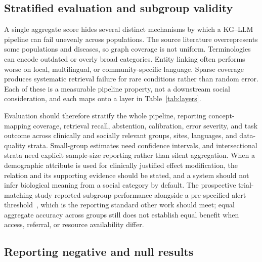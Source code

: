 \subsection{Stratified evaluation and subgroup validity}

A single aggregate score hides several distinct mechanisms by which a KG--LLM pipeline can fail unevenly across populations. The source literature overrepresents some populations and diseases, so graph coverage is not uniform. Terminologies can encode outdated or overly broad categories. Entity linking often performs worse on local, multilingual, or community-specific language. Sparse coverage produces systematic retrieval failure for rare conditions rather than random error. Each of these is a measurable pipeline property, not a downstream social consideration, and each maps onto a layer in Table~\ref{tab:layers}.

Evaluation should therefore stratify the whole pipeline, reporting concept-mapping coverage, retrieval recall, abstention, calibration, error severity, and task outcome across clinically and socially relevant groups, sites, languages, and data-quality strata. Small-group estimates need confidence intervals, and intersectional strata need explicit sample-size reporting rather than silent aggregation. When a demographic attribute is used for clinically justified effect modification, the relation and its supporting evidence should be stated, and a system should not infer biological meaning from a social category by default. The prospective trial-matching study reported subgroup performance alongside a pre-specified alert threshold~\cite{loaizabonilla2026trialmatch}, which is the reporting standard other work should meet; equal aggregate accuracy across groups still does not establish equal benefit when access, referral, or resource availability differ.

\subsection{Reporting negative and null results}

